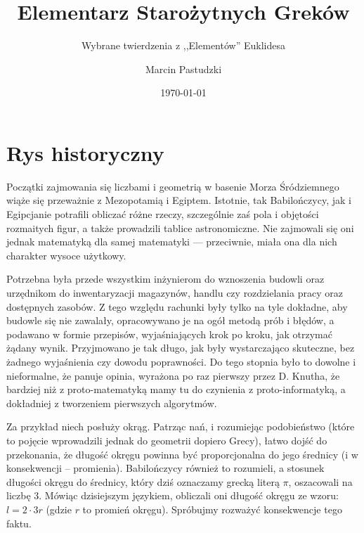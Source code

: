 \documentclass[12pt, a4paper]{scrartcl}
\title{Elementarz Starożytnych Greków}
\subtitle{Wybrane twierdzenia z ,,Elementów'' Euklidesa}
\author{Marcin Pastudzki}
\date{\today}
\begin{document}
\maketitle

\section*{Rys historyczny}

Początki zajmowania się liczbami i geometrią w basenie Morza Śródziemnego wiąże
się przeważnie z Mezopotamią i Egiptem. Istotnie, tak Babilończycy, jak i
Egipcjanie potrafili obliczać różne rzeczy, szczególnie zaś pola i objętości
rozmaitych figur, a także prowadzili tablice astronomiczne. Nie zajmowali się
oni jednak matematyką dla samej matematyki --- przeciwnie, miała ona dla nich
charakter wysoce użytkowy.

Potrzebna była przede wszystkim inżynierom do wznoszenia budowli oraz urzędnikom
do inwentaryzacji magazynów, handlu czy rozdzielania pracy oraz dostępnych
zasobów. Z tego względu rachunki były tylko na tyle dokładne, aby budowle się
nie zawalały, opracowywano je na ogół metodą prób i błędów, a podawano w
formie przepisów, wyjaśniających krok po kroku, jak otrzymać żądany wynik.
Przyjmowano je tak długo, jak były wystarczająco skuteczne, bez żadnego
wyjaśnienia czy dowodu poprawności. Do tego stopnia było to dowolne i
nieformalne, że panuje opinia, wyrażona po raz pierwszy przez D. Knutha, że
bardziej niż z proto-matematyką mamy tu do czynienia z proto-informatyką, a
dokładniej z tworzeniem pierwszych algorytmów.

Za przykład niech posłuży okrąg. Patrząc nań, i rozumiejąc podobieństwo (które
to pojęcie wprowadzili jednak do geometrii dopiero Grecy), łatwo dojść do
przekonania, że długość okręgu powinna być proporcjonalna do jego średnicy
(i w konsekwencji -- promienia). Babilończycy również to rozumieli, a stosunek
długości okręgu do średnicy, który dziś oznaczamy grecką literą \(\pi\),
oszacowali na liczbę \(3\). Mówiąc dzisiejszym językiem, obliczali oni długość
okręgu ze wzoru: \(l = 2 \cdot 3r\) (gdzie \(r\) to promień okręgu). Spróbujmy
rozważyć konsekwencje tego faktu.
\end{document}
